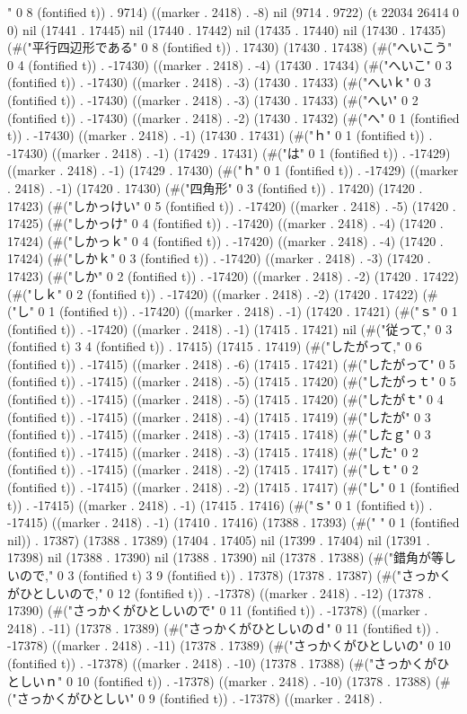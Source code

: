        " 0 8 (fontified t)) . 9714) ((marker . 2418) . -8) nil (9714 . 9722) (t 22034 26414 0 0) nil (17441 . 17445) nil (17440 . 17442) nil (17435 . 17440) nil (17430 . 17435) (#("平行四辺形である" 0 8 (fontified t)) . 17430) (17430 . 17438) (#("へいこう" 0 4 (fontified t)) . -17430) ((marker . 2418) . -4) (17430 . 17434) (#("へいこ" 0 3 (fontified t)) . -17430) ((marker . 2418) . -3) (17430 . 17433) (#("へいｋ" 0 3 (fontified t)) . -17430) ((marker . 2418) . -3) (17430 . 17433) (#("へい" 0 2 (fontified t)) . -17430) ((marker . 2418) . -2) (17430 . 17432) (#("へ" 0 1 (fontified t)) . -17430) ((marker . 2418) . -1) (17430 . 17431) (#("ｈ" 0 1 (fontified t)) . -17430) ((marker . 2418) . -1) (17429 . 17431) (#("は" 0 1 (fontified t)) . -17429) ((marker . 2418) . -1) (17429 . 17430) (#("ｈ" 0 1 (fontified t)) . -17429) ((marker . 2418) . -1) (17420 . 17430) (#("四角形" 0 3 (fontified t)) . 17420) (17420 . 17423) (#("しかっけい" 0 5 (fontified t)) . -17420) ((marker . 2418) . -5) (17420 . 17425) (#("しかっけ" 0 4 (fontified t)) . -17420) ((marker . 2418) . -4) (17420 . 17424) (#("しかっｋ" 0 4 (fontified t)) . -17420) ((marker . 2418) . -4) (17420 . 17424) (#("しかｋ" 0 3 (fontified t)) . -17420) ((marker . 2418) . -3) (17420 . 17423) (#("しか" 0 2 (fontified t)) . -17420) ((marker . 2418) . -2) (17420 . 17422) (#("しｋ" 0 2 (fontified t)) . -17420) ((marker . 2418) . -2) (17420 . 17422) (#("し" 0 1 (fontified t)) . -17420) ((marker . 2418) . -1) (17420 . 17421) (#("ｓ" 0 1 (fontified t)) . -17420) ((marker . 2418) . -1) (17415 . 17421) nil (#("従って," 0 3 (fontified t) 3 4 (fontified t)) . 17415) (17415 . 17419) (#("したがって," 0 6 (fontified t)) . -17415) ((marker . 2418) . -6) (17415 . 17421) (#("したがって" 0 5 (fontified t)) . -17415) ((marker . 2418) . -5) (17415 . 17420) (#("したがっｔ" 0 5 (fontified t)) . -17415) ((marker . 2418) . -5) (17415 . 17420) (#("したがｔ" 0 4 (fontified t)) . -17415) ((marker . 2418) . -4) (17415 . 17419) (#("したが" 0 3 (fontified t)) . -17415) ((marker . 2418) . -3) (17415 . 17418) (#("したｇ" 0 3 (fontified t)) . -17415) ((marker . 2418) . -3) (17415 . 17418) (#("した" 0 2 (fontified t)) . -17415) ((marker . 2418) . -2) (17415 . 17417) (#("しｔ" 0 2 (fontified t)) . -17415) ((marker . 2418) . -2) (17415 . 17417) (#("し" 0 1 (fontified t)) . -17415) ((marker . 2418) . -1) (17415 . 17416) (#("ｓ" 0 1 (fontified t)) . -17415) ((marker . 2418) . -1) (17410 . 17416) (17388 . 17393) (#(" " 0 1 (fontified nil)) . 17387) (17388 . 17389) (17404 . 17405) nil (17399 . 17404) nil (17391 . 17398) nil (17388 . 17390) nil (17388 . 17390) nil (17378 . 17388) (#("錯角が等しいので," 0 3 (fontified t) 3 9 (fontified t)) . 17378) (17378 . 17387) (#("さっかくがひとしいので," 0 12 (fontified t)) . -17378) ((marker . 2418) . -12) (17378 . 17390) (#("さっかくがひとしいので" 0 11 (fontified t)) . -17378) ((marker . 2418) . -11) (17378 . 17389) (#("さっかくがひとしいのｄ" 0 11 (fontified t)) . -17378) ((marker . 2418) . -11) (17378 . 17389) (#("さっかくがひとしいの" 0 10 (fontified t)) . -17378) ((marker . 2418) . -10) (17378 . 17388) (#("さっかくがひとしいｎ" 0 10 (fontified t)) . -17378) ((marker . 2418) . -10) (17378 . 17388) (#("さっかくがひとしい" 0 9 (fontified t)) . -17378) ((marker . 2418) . 